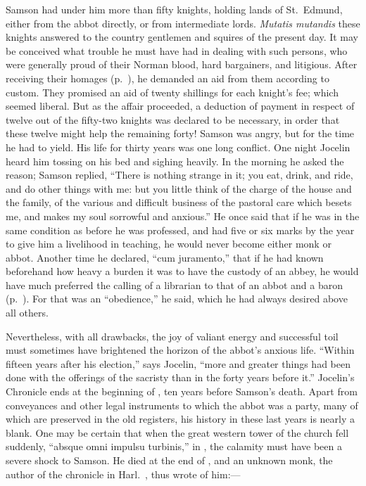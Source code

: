 \documentclass[10pt]{book}
\begin{document}
{Samson had under him more than fifty knights, holding lands of St.\ Edmund, either from the abbot directly, or from intermediate lords. \emph{Mutatis mutandis} these knights answered to the country gentlemen and squires of the present day. It may be conceived what trouble he must have had in dealing with such persons, who were generally proud of their Norman blood, hard bargainers, and litigious. After receiving their homages (p.\ ), he demanded an aid from them according to custom. They promised an aid of twenty shillings for each knight's fee; which seemed liberal. But as the affair proceeded, a deduction of payment in respect of twelve out of the fifty-two knights was declared to be necessary, in order that these twelve might help the remaining forty! Samson was angry, but for the time he had to yield. His life for thirty years was one long conflict. One night Jocelin heard him tossing on his bed and sighing heavily. In the morning he asked the reason; Samson replied, ``There is nothing strange in it; you eat, drink, and ride, and do other things with me: but you little think of the charge of the house and the family, of the various and difficult business of the pastoral care which besets me, and makes my soul sorrowful and anxious.'' He once said that if he was in the same condition as before he was professed, and had five or six marks by the year to give him a livelihood in teaching, he would never become either monk or abbot. Another time he declared, ``cum juramento,'' that if he had known beforehand how heavy a burden it was to have the custody of an abbey, he would have much preferred the calling of a librarian to that of an abbot and a baron (p.\ ). For that was an ``obedience,'' he said, which he had always desired above all others.

Nevertheless, with all drawbacks, the joy of valiant energy and successful toil must sometimes have brightened the horizon of the abbot's anxious life. ``Within fifteen years after his election,'' says Jocelin, ``more and greater things had been done with the offerings of the sacristy than in the forty years before it.'' Jocelin's Chronicle ends at the beginning of , ten years before Samson's death. Apart from conveyances and other legal instruments to which the abbot was a party, many of which are preserved in the old registers, his history in these last years is nearly a blank. One may be certain that when the great western tower of the church fell suddenly, ``absque omni impulsu turbinis,'' in , the calamity must have been a severe shock to Samson. He died at the end of , and an unknown monk, the author of the chronicle in Harl.\ , thus wrote of him:---

}
\end{document}
